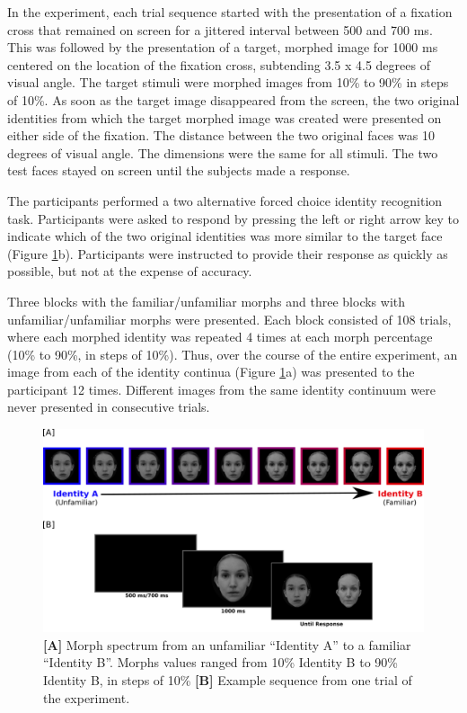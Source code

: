 \documentclass[10pt,letterpaper]{article}
\begin{document}
In the experiment, each trial sequence started with the presentation of a fixation cross that remained on screen for a jittered interval between 500 and 700 ms. This was followed by the presentation of a target, morphed image for 1000 ms centered on the location of the fixation cross, subtending 3.5 x 4.5 degrees of visual angle. The target stimuli were morphed images from 10\% to 90\% in steps of 10\%. As soon as the target image disappeared from the screen, the two original identities from which the target morphed image was created were presented on either side of the fixation. The distance between the two original faces was 10 degrees of visual angle. The dimensions were the same for all stimuli. The two test faces stayed on screen until the subjects made a response.  

The participants performed a two alternative forced choice identity recognition task. Participants were asked to respond by pressing the left or right arrow key to indicate which of the two original identities was more similar to the target face (Figure \ref{Figure 1}b). Participants were instructed to provide their response as quickly as possible, but not at the expense of accuracy. 

Three blocks with the familiar/unfamiliar morphs and three blocks with unfamiliar/unfamiliar morphs were presented. Each block consisted of 108 trials, where each morphed identity was repeated 4 times at each morph percentage (10\% to 90\%, in steps of 10\%). Thus, over the course of the entire experiment, an image from each of the identity continua (Figure \ref{Figure 1}a) was presented to the participant 12 times. Different images from the same identity continuum were never presented in consecutive trials. 

\begin{figure}[ht] %

\includegraphics[width=\textwidth]{figure1_new.png}

\caption{\color{Gray} \textbf{[A]} Morph spectrum from an unfamiliar “Identity A” to a familiar “Identity B”. Morphs values ranged from 10\% Identity B to 90\% Identity B, in steps of 10\% \textbf{[B]} Example sequence from one trial of the experiment.}

\label{Figure 1} %

\end{figure}
\end{document}
